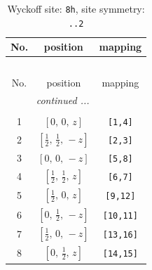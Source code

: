 \documentclass[fleqn,8pt]{jsarticle}
\begin{document}
\begin{longtable}{ccc}
\caption{Wyckoff site: {\tt 8h}, site symmetry: {\tt ..2}}
 \\
 \hline \hline
No. & position & mapping \\ \hline \endfirsthead

\multicolumn{2}{l}{\tablename\ \thetable{}} \\
 \hline \hline
No. & position & mapping \\ \hline \endhead

 \hline \hline
\multicolumn{2}{r}{\footnotesize\it continued ...} \\ \endfoot

 \hline \hline
\multicolumn{2}{r}{} \\ \endlastfoot

1 & $\left[ 0,\, 0,\, z \right]$ & {\tt [1,4]} \\ \hline
2 & $\left[ \frac{1}{2},\, \frac{1}{2},\, - z \right]$ & {\tt [2,3]} \\ \hline
3 & $\left[ 0,\, 0,\, - z \right]$ & {\tt [5,8]} \\ \hline
4 & $\left[ \frac{1}{2},\, \frac{1}{2},\, z \right]$ & {\tt [6,7]} \\ \hline
5 & $\left[ \frac{1}{2},\, 0,\, z \right]$ & {\tt [9,12]} \\ \hline
6 & $\left[ 0,\, \frac{1}{2},\, - z \right]$ & {\tt [10,11]} \\ \hline
7 & $\left[ \frac{1}{2},\, 0,\, - z \right]$ & {\tt [13,16]} \\ \hline
8 & $\left[ 0,\, \frac{1}{2},\, z \right]$ & {\tt [14,15]} \\
\end{longtable}
\renewcommand{\arraystretch}{1.2}
\end{document}
